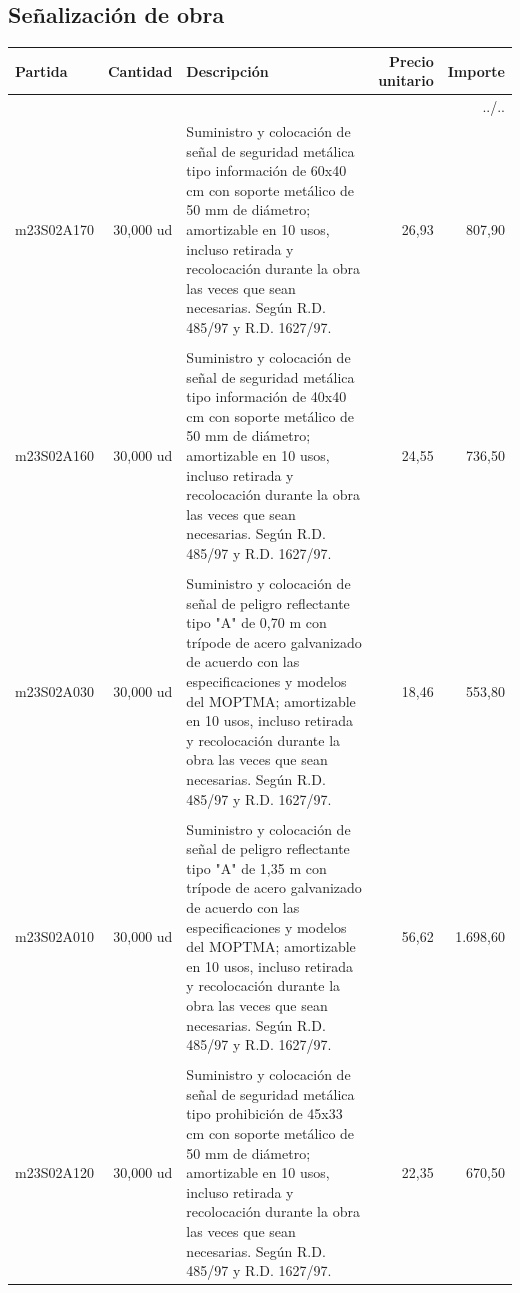 \documentclass{book}%
\begin{document}
%
\subsection{Señalización de obra}%
\small%
\begin{longtable}{lrlrr}%
Partida&Cantidad&Descripción&\multicolumn{1}{p{1.5cm}}{Precio unitario}&Importe\\%
\hline%
\endhead%
\multicolumn{5}{r}{../..}\\%
\endfoot%
\hline%
\endlastfoot%
m23S02A170&    30,000 ud&\multicolumn{1}{p{5cm}}{Suministro y colocación de señal de seguridad metálica tipo información de 60x40 cm con soporte metálico de 50 mm de diámetro; amortizable en 10 usos, incluso retirada y recolocación durante la obra las veces que sean necesarias. Según R.D. 485/97 y R.D. 1627/97.}&     26,93&807,90\\%
&&&&\\%
m23S02A160&    30,000 ud&\multicolumn{1}{p{5cm}}{Suministro y colocación de señal de seguridad metálica tipo información de 40x40 cm con soporte metálico de 50 mm de diámetro; amortizable en 10 usos, incluso retirada y recolocación durante la obra las veces que sean necesarias. Según R.D. 485/97 y R.D. 1627/97.}&     24,55&736,50\\%
&&&&\\%
m23S02A030&    30,000 ud&\multicolumn{1}{p{5cm}}{Suministro y colocación de señal de peligro reflectante tipo "A" de 0,70 m con trípode de acero galvanizado de acuerdo con las especificaciones y modelos del MOPTMA; amortizable en 10 usos, incluso retirada y recolocación durante la obra las veces que sean necesarias. Según R.D. 485/97 y R.D. 1627/97.}&     18,46&553,80\\%
&&&&\\%
m23S02A010&    30,000 ud&\multicolumn{1}{p{5cm}}{Suministro y colocación de señal de peligro reflectante tipo "A" de 1,35 m con trípode de acero galvanizado de acuerdo con las especificaciones y modelos del MOPTMA; amortizable en 10 usos, incluso retirada y recolocación durante la obra las veces que sean necesarias. Según R.D. 485/97 y R.D. 1627/97.}&     56,62&1.698,60\\%
&&&&\\%
m23S02A120&    30,000 ud&\multicolumn{1}{p{5cm}}{Suministro y colocación de señal de seguridad metálica tipo prohibición de 45x33 cm con soporte metálico de 50 mm de diámetro; amortizable en 10 usos, incluso retirada y recolocación durante la obra las veces que sean necesarias. Según R.D. 485/97 y R.D. 1627/97.}&     22,35&670,50\\%

\end{longtable}
\end{document}

